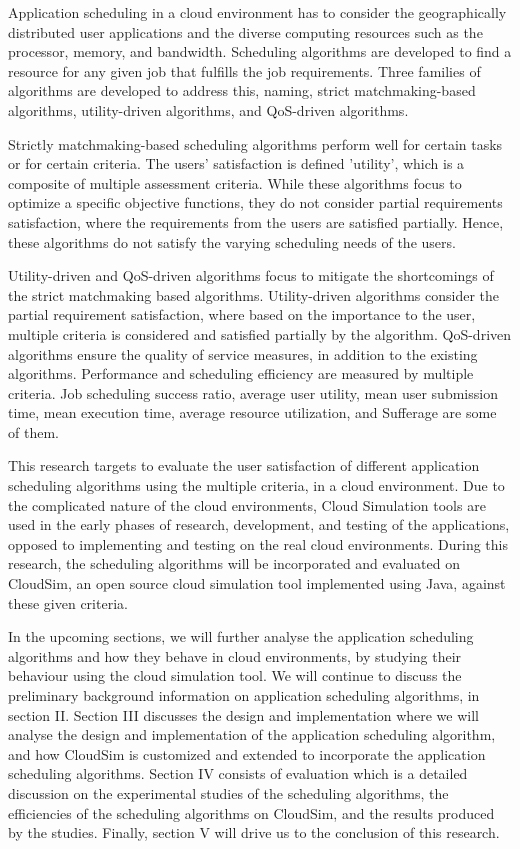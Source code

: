 \documentclass[times, 10pt,twocolumn]{article}
\begin{document}
Application scheduling in a cloud environment has to consider the geographically distributed user applications and the diverse computing resources such as the processor, memory, and bandwidth. Scheduling algorithms are developed to find a resource for any given job that fulfills the job requirements. Three families of algorithms are developed to address this, naming, strict matchmaking-based algorithms, utility-driven algorithms, and QoS-driven algorithms.

Strictly matchmaking-based scheduling algorithms perform well for certain tasks or for certain criteria. The users' satisfaction is defined 'utility', which is a composite of multiple assessment criteria. While these algorithms focus to optimize a specific objective functions, they do not consider partial requirements satisfaction, where the requirements from the users are satisfied partially. Hence, these algorithms do not satisfy the varying scheduling needs of the users. 

Utility-driven and QoS-driven algorithms focus to mitigate the shortcomings of the strict matchmaking based algorithms. Utility-driven algorithms consider the partial requirement satisfaction, where based on the importance to the user, multiple criteria is considered and satisfied partially by the algorithm. QoS-driven algorithms ensure the quality of service measures, in addition to the existing algorithms. Performance and scheduling efficiency are measured by multiple criteria. Job scheduling success ratio, average user utility, mean user submission time, mean execution time, average resource utilization, and Sufferage are some of them. 

This research targets to evaluate the user satisfaction of different application scheduling algorithms using the multiple criteria, in a cloud environment. Due to the complicated nature of the cloud environments, Cloud Simulation tools are used in the early phases of research, development, and testing of the applications, opposed to implementing and testing on the real cloud environments. During this research, the scheduling algorithms will be incorporated and evaluated on CloudSim, an open source cloud simulation tool implemented using Java, against these given criteria. 

In the upcoming sections, we will further analyse the application scheduling algorithms and how they behave in cloud environments, by studying their behaviour using the cloud simulation tool. We will continue to discuss the preliminary background information on application scheduling algorithms, in section II. Section III discusses the design and implementation where we will analyse the design and implementation of the application scheduling algorithm, and how CloudSim is customized and extended to incorporate the application scheduling algorithms. Section IV consists of evaluation which is a detailed discussion on the experimental studies of the scheduling algorithms, the efficiencies of the scheduling algorithms on CloudSim, and the results produced by the studies. Finally, section V will drive us to the conclusion of this research.
\end{document}
